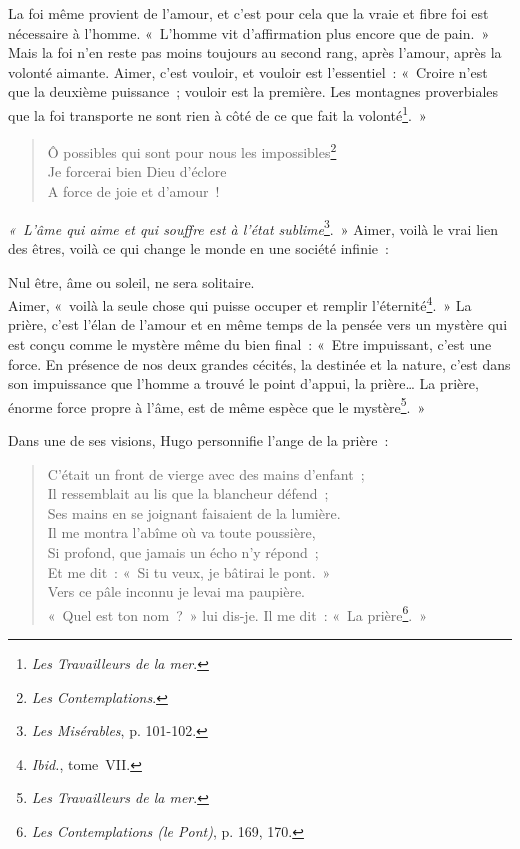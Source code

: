 \documentclass[french,twoside]{book} %
\begin{document}
\noindent La foi même provient de l’amour, et c’est pour cela que la vraie et fibre foi est nécessaire à l’homme. « L’homme vit d’affirmation plus encore que de pain. » Mais la foi n’en reste pas moins toujours au second rang, après l’amour, après la volonté aimante. Aimer, c’est vouloir, et vouloir est l’essentiel : « Croire n’est que la deuxième puissance ; vouloir est la première. Les montagnes proverbiales que la foi transporte ne sont rien à côté de ce que fait la volonté\footnote{\emph{Les Travailleurs de la mer}.}. »\par


\begin{verse}
Ô possibles qui sont pour nous les impossibles\footnote{\emph{Les Contemplations}.}\\
Je forcerai bien Dieu d’éclore\\
A force de joie et d’amour !\\
\end{verse}

\noindent \emph{« L’âme qui aime et qui souffre est à l’état sublime}\footnote{\emph{Les Misérables}, p. 101-102.}. » Aimer, voilà le vrai lien des êtres, voilà ce qui change le monde en une société infinie :\par

Nul être, âme ou soleil, ne sera solitaire.\\

\noindent Aimer, « voilà la seule chose qui puisse occuper et remplir l’éternité\footnote{\emph{Ibid.}, tome VII.}. » La prière, c’est l’élan de l’amour et en même temps de la pensée vers un mystère qui est conçu comme le mystère même du bien final : « Etre impuissant, c’est une force. En présence de nos deux grandes cécités, la destinée et la nature, c’est dans son impuissance que l’homme a trouvé le point d’appui, la prière… La prière, énorme force propre à l’âme, est de même espèce que le mystère\footnote{\emph{Les Travailleurs de la mer}.}. »\par
Dans une de ses visions, Hugo personnifie l’ange de la prière :\par


\begin{verse}
C’était un front de vierge avec des mains d’enfant ;\\
Il ressemblait au lis que la blancheur défend ;\\
Ses mains en se joignant faisaient de la lumière.\\
Il me montra l’abîme où va toute poussière,\\
Si profond, que jamais un écho n’y répond ;\\
Et me dit : « Si tu veux, je bâtirai le pont. »\\
Vers ce pâle inconnu je levai ma paupière.\\
« Quel est ton nom ? » lui dis-je. Il me dit : « La prière\footnote{\emph{Les Contemplations (le Pont)}, p. 169, 170.}. »\\
\end{verse}
\end{document}
